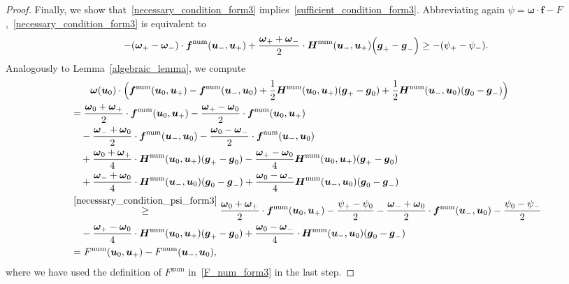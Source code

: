 \documentclass[]{scrartcl}
\renewcommand{\vec}[1]{\boldsymbol{#1}}
\theoremstyle{definition}
\begin{document}
\begin{proof}
Finally, we show that~\eqref{necessary_condition_form3} implies~\eqref{sufficient_condition_form3}. Abbreviating again $\psi = \vec{\omega} \cdot \vec{f} - F$,~\eqref{necessary_condition_form3} is equivalent to
\begin{equation}
  -(\vec{\omega}_+ - \vec{\omega}_-  ) \cdot \vec{f}^\mathrm{num}(\vec{u}_-, \vec{u}_+) + \frac{\vec{\omega}_+ + \vec{\omega}_-}{2} \cdot \vec{H}^{\mathrm{num}}(\vec{u}_-, \vec{u}_+) \Bigl ( \vec{g}_+ - \vec{g}_- \Bigr )\geq -(\psi_+ - \psi_-).
  \label{necessary_condition_psi_form3}
\end{equation}
Analogously to Lemma~\ref{algebraic_lemma}, we compute
\begin{equation}
\begin{aligned}
 &\qquad
 \vec{\omega}(\vec{u}_0) \cdot \Bigl ( \vec{f}^{\mathrm{num}}(\vec{u}_0, \vec{u}_+) - \vec{f}^{\mathrm{num}}(\vec{u}_-, \vec{u}_0) + \frac{1}{2}\vec{H}^\mathrm{num} (\vec{u}_0, \vec{u}_+) ( \vec{g}_+ - \vec{g}_0 ) + \frac{1}{2}\vec{H}^\mathrm{num}(\vec{u}_-, \vec{u}_0)  (\vec{g}_0 - \vec{g}_-  )  \Bigr )
 \\
 &= \frac{\vec{\omega}_0 + \vec{\omega}_+}{2} \cdot \vec{f}^{\mathrm{num}}(\vec{u}_0,\vec{u}_+) - \frac{\vec{\omega}_+ - \vec{\omega}_0}{2} \cdot \vec{f}^{\mathrm{num}} (\vec{u}_0,\vec{u}_+)
 \\
 &\quad - \frac{\vec{\omega}_- + \vec{\omega}_0}{2} \cdot \vec{f}^\mathrm{num}(\vec{u}_-, \vec{u}_0)
    - \frac{\vec{\omega}_0 - \vec{\omega}_-}{2} \cdot \vec{f}^\mathrm{num}(\vec{u}_-, \vec{u}_0)
    \\
    &\quad + \frac{\vec{\omega}_0 + \vec{\omega}_+}{4} \cdot \vec{H}^{\mathrm{num}}(\vec{u}_0, \vec{u}_+) (\vec{g}_+ - \vec{g}_0) - \frac{\vec{\omega}_+ - \vec{\omega}_0}{4} \vec{H}^{\mathrm{num}}(\vec{u}_0, \vec{u}_+)(\vec{g}_+ - \vec{g}_0)
    \\
    &\quad +\frac{\vec{\omega}_- + \vec{\omega}_0}{4} \cdot \vec{H}^{\mathrm{num}}(\vec{u}_-, \vec{u}_0) (\vec{g}_0 - \vec{g}_-) + \frac{\vec{\omega}_0 - \vec{\omega}_-}{4} \vec{H}^{\mathrm{num}}(\vec{u}_-, \vec{u}_0)(\vec{g}_0 - \vec{g}_-)
    \\
    &\stackrel{\eqref{necessary_condition_psi_form3}}{\ge}
    \frac{\vec{\omega}_0 + \vec{\omega}_+}{2} \cdot \vec{f}^\mathrm{num}(\vec{u}_0, \vec{u}_+)
    - \frac{\psi_+ - \psi_0}{2}
    - \frac{\vec{\omega}_- + \vec{\omega}_0}{2} \cdot \vec{f}^\mathrm{num}(\vec{u}_-, \vec{u}_0)
    - \frac{\psi_0 - \psi_-}{2}
    \\
     &\quad - \frac{\vec{\omega}_+ - \vec{\omega}_0}{4}\cdot \vec{H}^{\mathrm{num}}(\vec{u}_0, \vec{u}_+)(\vec{g}_+ - \vec{g}_0) + \frac{\vec{\omega}_0 - \vec{\omega}_-}{4} \cdot \vec{H}^{\mathrm{num}}(\vec{u}_-, \vec{u}_0)(\vec{g}_0 - \vec{g}_-)
     \\
     &= F^{\mathrm{num}}(\vec{u}_0, \vec{u}_+) - F^{\mathrm{num}}(\vec{u}_-, \vec{u}_0),
 \end{aligned}
\end{equation}
where we have used the definition of $F^{\mathrm{num}}$ in~\eqref{F_num_form3} in the last step.
\end{proof}
\end{document}
